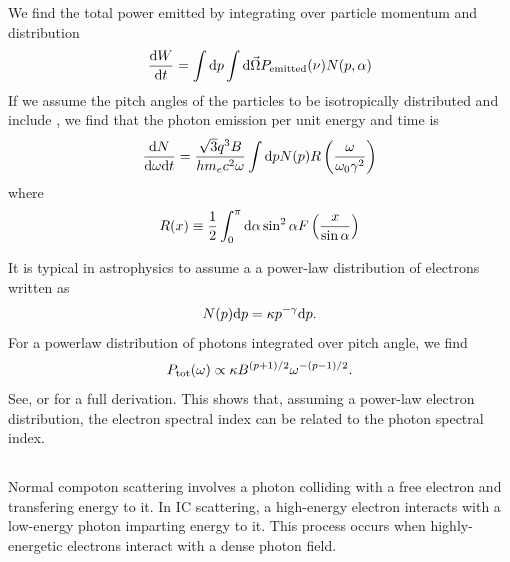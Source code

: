 We find the total power emitted by integrating over particle
momentum and distribution
\begin{equation}
  \frac{\text{d} W}{\text{d}t}=
  \int \text{d} p 
  \int \text{d} \vec\Omega
  P_\text{emitted}(\nu)
  N(p,\alpha)
\end{equation}
If we assume the pitch angles of the particles to be isotropically
distributed and include , we
find that the photon emission per unit energy and time is
\begin{equation}
  \frac{\text{d} N}{\text{d} \omega \text{d} t} =
  \frac{\sqrt{3}q^3 B}{h m_e c^2 \omega}
  \int \text{d}p
  N(p)
  R \left(\frac{\omega}{\omega_0 \gamma^2}\right)
\end{equation}
where
\begin{equation}
  R(x) \equiv \frac{1}{2} \int_0^\pi
  \text{d} \alpha \sin^2 \alpha
  F\left(\frac{x}{\sin\alpha}\right)
\end{equation}

It is typical in astrophysics to assume a 
a power-law distribution of electrons written as
\begin{equation}
\eqnlabel{ElectronPowerLawEnergyDistribution}
  \ParticleDistribution(\momentum) \derivative\momentum = 
  \kappa \momentum^{-\spectralindex} \derivative\momentum.
\end{equation}
For a powerlaw distribution of photons integrated over
pitch angle, we find
\begin{equation}
P_\text{tot}(\omega) \propto \kappa B^{(p+1)/2} 
\omega^{-(p-1)/2}.
\end{equation}
See, \cite{rybicki_1979a_radiative-processes} 
or \cite{longair_2013a_energy-astrophysics} for a full derivation.
This shows that, assuming a power-law electron distribution,
the electron spectral index can be related to the photon spectral
index.

\subsection{}

Normal compoton scattering involves a photon colliding with a free electron
and transfering energy to it. In \ac{IC} scattering, a high-energy 
electron interacts with a low-energy photon imparting energy to it.
This process occurs when highly-energetic electrons interact with
a dense photon field.

